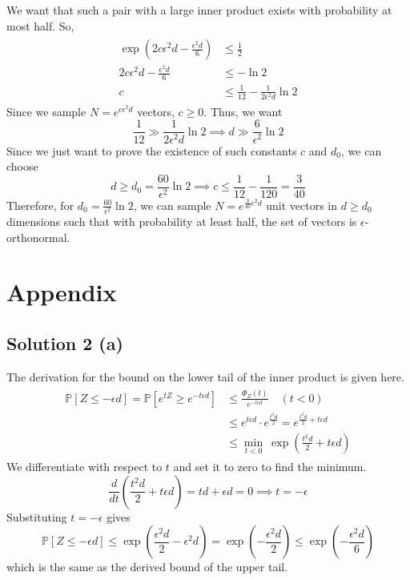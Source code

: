 \documentclass[9pt]{article}
\begin{document}
We want that such a pair with a large inner product exists with probability at most half. So,
\begin{align}
    \begin{split}
        \exp{\left( 2c \epsilon^{2} d -\frac{\epsilon^{2}d}{6} \right)} &\leq \frac{1}{2} \\
        2c \epsilon^{2} d -\frac{\epsilon^{2}d}{6} &\leq -\ln{2} \\
        c &\leq \frac{1}{12} - \frac{1}{2\epsilon^{2}d} \ln{2}
    \end{split}
\end{align}
Since we sample $N = e^{c \epsilon^{2} d}$ vectors, $c \geq 0$. Thus, we want
\begin{equation}
    \frac{1}{12} \gg \frac{1}{2\epsilon^{2}d} \ln{2} \implies d \gg \frac{6}{\epsilon^{2}} \ln{2}
\end{equation}
Since we just want to prove the existence of such constants $c$ and $d_{0}$, we can choose
\begin{equation}
    d \geq d_{0} = \frac{60}{\epsilon^{2}} \ln{2} \implies c \leq \frac{1}{12} - \frac{1}{120} = \frac{3}{40}
\end{equation}
Therefore, for $d_{0} = \frac{60}{\epsilon^{2}} \ln{2}$, we can sample $N = e^{\frac{3}{40} \epsilon^{2} d}$
unit vectors in $d \geq d_{0}$ dimensions such that with probability at least half, the set of vectors is
$\epsilon$-orthonormal.

\section*{Appendix}
\subsection*{Solution 2 (a)}
The derivation for the bound on the lower tail of the inner product is given here.
\begin{align}
    \begin{split}
        \mathbb{P}[Z \leq -\epsilon d] = \mathbb{P}[e^{tZ} \geq e^{-t\epsilon d}]
        &\leq \frac{\Phi_{Z}(t)}{e^{-t \epsilon d}} \quad (t < 0) \\
        &\leq e^{t \epsilon d} \cdot e^{\frac{t^{2}d}{2}} = e^{\frac{t^{2}d}{2} + t \epsilon d} \\
        &\leq \min_{t < 0} \ \exp{\left( \frac{t^{2}d}{2} + t \epsilon d \right)}
    \end{split}
\end{align}
We differentiate with respect to $t$ and set it to zero to find the minimum.
\begin{equation}
    \frac{d}{dt} \left( \frac{t^{2}d}{2} + t \epsilon d \right) = td + \epsilon d = 0 \implies t = -\epsilon
\end{equation}
Substituting $t = -\epsilon$ gives
\begin{equation}
    \mathbb{P}[Z \leq -\epsilon d] \leq \exp{\left( \frac{\epsilon^{2}d}{2} - \epsilon^{2}d \right)}
    = \exp{\left( -\frac{\epsilon^{2}d}{2} \right)}
    \leq \exp{\left( -\frac{\epsilon^{2}d}{6} \right)}
\end{equation}
which is the same as the derived bound of the upper tail.
\end{document}
